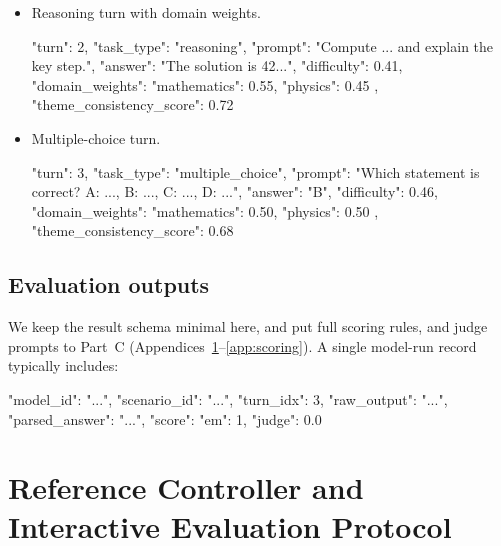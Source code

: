 \begin{itemize}
    \item[(i)]Reasoning turn with domain weights.
    \begin{XDBVerbatim}
        {
          "turn": 2,
          "task_type": "reasoning",
          "prompt": "Compute ... and explain the key step.",
          "answer": "The solution is 42...",
          "difficulty": 0.41,
          "domain_weights": {
            "mathematics": 0.55,
            "physics": 0.45
          },
          "theme_consistency_score": 0.72
        }
    \end{XDBVerbatim}
    \item[(ii)]Multiple-choice turn.
    \begin{XDBVerbatim}
    {
      "turn": 3,
      "task_type": "multiple_choice",
      "prompt": "Which statement is correct? A: ..., B: ..., C: ..., D: ...",
      "answer": "B",
      "difficulty": 0.46,
      "domain_weights": {
        "mathematics": 0.50,
        "physics": 0.50
      },
      "theme_consistency_score": 0.68
    }
    \end{XDBVerbatim}
\end{itemize}



\subsection{Evaluation outputs}
\label{app:result_format_min}
We keep the result schema minimal here, and put full scoring rules, and judge prompts to Part~C (Appendices~\ref{app:controller}--\ref{app:scoring}). A single model-run record typically includes:
\begin{XDBVerbatim}
{
  "model_id": "...",
  "scenario_id": "...",
  "turn_idx": 3,
  "raw_output": "...",
  "parsed_answer": "...",
  "score": {"em": 1, "judge": 0.0}
}
\end{XDBVerbatim}

\clearpage
{}
\section{Reference Controller and Interactive Evaluation Protocol}
\label{app:controller}

